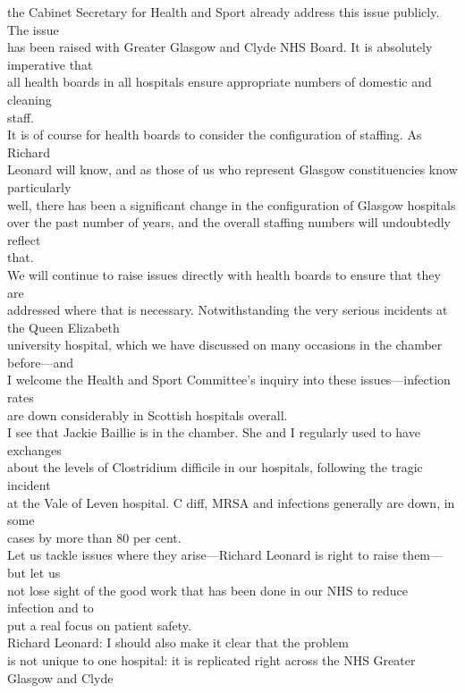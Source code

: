 \documentclass{article}
\begin{document}
\begin{description}
{the Cabinet Secretary for Health and Sport already address this issue publicly. The issue\\
has been raised with Greater Glasgow and Clyde NHS Board. It is absolutely imperative that\\
all health boards in all hospitals ensure appropriate numbers of domestic and cleaning\\
staff.\\
It is of course for health boards to consider the configuration of staffing. As Richard\\
Leonard will know, and as those of us who represent Glasgow constituencies know particularly\\
well, there has been a significant change in the configuration of Glasgow hospitals\\
over the past number of years, and the overall staffing numbers will undoubtedly reflect\\
that.\\
We will continue to raise issues directly with health boards to ensure that they are\\
addressed where that is necessary. Notwithstanding the very serious incidents at the Queen Elizabeth\\
university hospital, which we have discussed on many occasions in the chamber before—and\\
I welcome the Health and Sport Committee’s inquiry into these issues—infection rates\\
are down considerably in Scottish hospitals overall.\\
I see that Jackie Baillie is in the chamber. She and I regularly used to have exchanges\\
about the levels of Clostridium difficile in our hospitals, following the tragic incident\\
at the Vale of Leven hospital. C diff, MRSA and infections generally are down, in some\\
cases by more than 80 per cent.\\
Let us tackle issues where they arise—Richard Leonard is right to raise them—but let us\\
not lose sight of the good work that has been done in our NHS to reduce infection and to\\
put a real focus on patient safety.\\
Richard Leonard: I should also make it clear that the problem\\
is not unique to one hospital: it is replicated right across the NHS Greater Glasgow and Clyde\\
}
\end{description}
\end{document}
